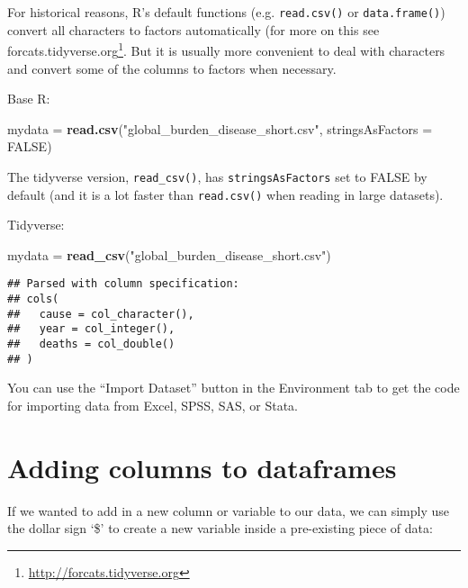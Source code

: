 \documentclass[]{book}
\makeatletter
\newenvironment{Shaded}{\begin{snugshade}}{\end{snugshade}}
\newcommand{\KeywordTok}[1]{\textcolor[rgb]{0.13,0.29,0.53}{\textbf{#1}}}
\newcommand{\DataTypeTok}[1]{\textcolor[rgb]{0.13,0.29,0.53}{#1}}
\newcommand{\DecValTok}[1]{\textcolor[rgb]{0.00,0.00,0.81}{#1}}
\newcommand{\StringTok}[1]{\textcolor[rgb]{0.31,0.60,0.02}{#1}}
\newcommand{\OtherTok}[1]{\textcolor[rgb]{0.56,0.35,0.01}{#1}}
\newcommand{\OperatorTok}[1]{\textcolor[rgb]{0.81,0.36,0.00}{\textbf{#1}}}
\newcommand{\NormalTok}[1]{#1}
\let\rmarkdownfootnote\footnote%
\def\footnote{\protect\rmarkdownfootnote}
\renewcommand{\href}[2]{#2\footnote{\url{#1}}}
\newenvironment{kframe}{%
\medskip{}
\setlength{\fboxsep}{.8em}
 \def\at@end@of@kframe{}%
 \ifinner\ifhmode%
  \def\at@end@of@kframe{\end{minipage}}%
  \begin{minipage}{\columnwidth}%
 \fi\fi%
 \def\FrameCommand##1{\hskip\@totalleftmargin \hskip-\fboxsep
 \colorbox{shadecolor}{##1}\hskip-\fboxsep
     \hskip-\linewidth \hskip-\@totalleftmargin \hskip\columnwidth}%
 \MakeFramed {\advance\hsize-\width
   \@totalleftmargin\z@ \linewidth\hsize
   \@setminipage}}%
 {\par\unskip\endMakeFramed%
 \at@end@of@kframe}
\renewenvironment{Shaded}{\begin{kframe}}{\end{kframe}}
\theoremstyle{definition}
\theoremstyle{definition}
\theoremstyle{definition}
\theoremstyle{remark}
\makeatother
\begin{document}
For historical reasons, R's default functions (e.g. \texttt{read.csv()}
or \texttt{data.frame()}) convert all characters to factors
automatically (for more on this see
\href{http://forcats.tidyverse.org}{forcats.tidyverse.org}. But it is
usually more convenient to deal with characters and convert some of the
columns to factors when necessary.

Base R:

\begin{Shaded}
\begin{Highlighting}[]
\NormalTok{mydata =}\StringTok{ }\KeywordTok{read.csv}\NormalTok{(}\StringTok{"global_burden_disease_short.csv"}\NormalTok{, }\DataTypeTok{stringsAsFactors =} \OtherTok{FALSE}\NormalTok{)}
\end{Highlighting}
\end{Shaded}

The tidyverse version, \texttt{read\_csv()}, has
\texttt{stringsAsFactors} set to FALSE by default (and it is a lot
faster than \texttt{read.csv()} when reading in large datasets).

Tidyverse:

\begin{Shaded}
\begin{Highlighting}[]
\NormalTok{mydata =}\StringTok{ }\KeywordTok{read_csv}\NormalTok{(}\StringTok{"global_burden_disease_short.csv"}\NormalTok{)}
\end{Highlighting}
\end{Shaded}

\begin{verbatim}
## Parsed with column specification:
## cols(
##   cause = col_character(),
##   year = col_integer(),
##   deaths = col_double()
## )
\end{verbatim}

You can use the ``Import Dataset'' button in the Environment tab to get
the code for importing data from Excel, SPSS, SAS, or Stata.

\section{Adding columns to
dataframes}\label{adding-columns-to-dataframes}

If we wanted to add in a new column or variable to our data, we can
simply use the dollar sign `\$' to create a new variable inside a
pre-existing piece of data:

\begin{Shaded}
\end{Shaded}
\end{document}
